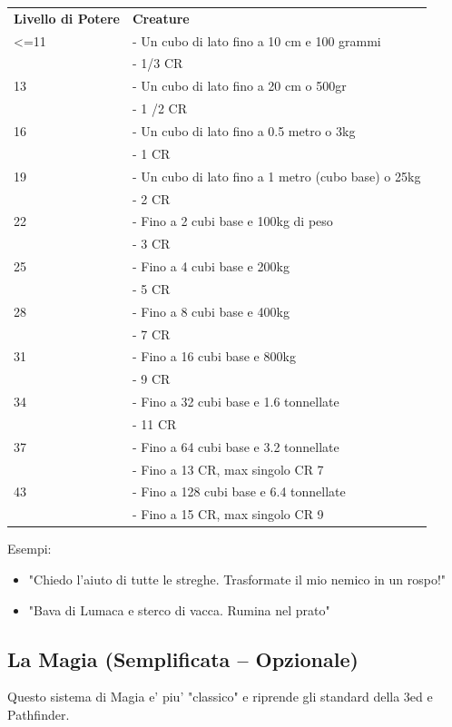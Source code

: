 \documentclass[a4paper,11pt,twoside,openany]{book}
\begin{document}
\bigskip

\begin{tabular}{L{3cm} L{10cm}}
\toprule
\textbf{Livello di Potere} & \textbf{Creature}\tabularnewline
<=11& - Un cubo di lato fino a 10 cm e 100 grammi\\
&- 1/3 CR\\
13& - Un cubo di lato fino a 20 cm o 500gr\\
&- 1 /2 CR\\
16& - Un cubo di lato fino a 0.5 metro o 3kg\\
&- 1 CR\\
19& - Un cubo di lato fino a 1 metro (cubo base) o 25kg\\
&- 2 CR\\
22& - Fino a 2 cubi base e 100kg di peso\\
&- 3 CR\\
25& - Fino a 4 cubi base e 200kg\\
&- 5 CR\\
28& - Fino a 8 cubi base e 400kg\\
&- 7 CR\\
31& - Fino a 16 cubi base e 800kg\\
&- 9 CR\\
34& - Fino a 32 cubi base e 1.6 tonnellate\\
&- 11 CR\\
37& - Fino a 64 cubi base e 3.2 tonnellate\\
&- Fino a 13 CR, max singolo CR 7\\
43& - Fino a 128 cubi base e 6.4 tonnellate\\
&- Fino a 15 CR, max singolo CR 9\\
\end{tabular}

\bigskip


Esempi:
\begin{itemize}
\item 
"Chiedo l'aiuto di tutte le streghe. Trasformate il mio nemico in un rospo!" 
\item 
"Bava di Lumaca e sterco di vacca. Rumina nel prato" 
\end{itemize}

\pagebreak

\subsection{La Magia (Semplificata -- Opzionale)}


Questo sistema di Magia e' piu' "classico" e riprende gli standard della 3ed e Pathfinder.
\end{document}
